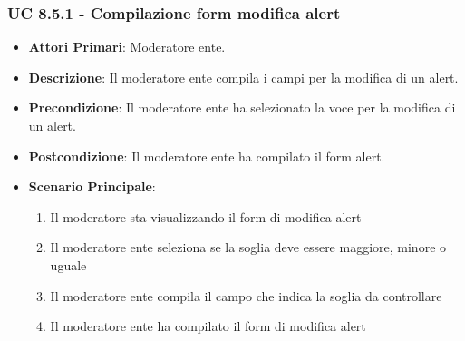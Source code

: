 			\subsubsection{UC 8.5.1 - Compilazione form modifica alert}
			\begin{itemize}
				\item \textbf{Attori Primari}: Moderatore ente.
				\item \textbf{Descrizione}: Il moderatore ente compila i campi per la modifica di un alert.
				\item \textbf{Precondizione}: Il moderatore ente ha selezionato la voce per la modifica di un alert.
				\item \textbf{Postcondizione}: Il moderatore ente ha compilato il form alert.
				\item \textbf{Scenario Principale}:
				\begin{enumerate}
					\item{Il moderatore sta visualizzando il form di modifica alert}
					\item{Il moderatore ente seleziona se la soglia deve essere maggiore, minore o uguale}
					\item{Il moderatore ente compila il campo che indica la soglia da controllare}
					\item{Il moderatore ente ha compilato il form di modifica alert}
				\end{enumerate}	
			\end{itemize}